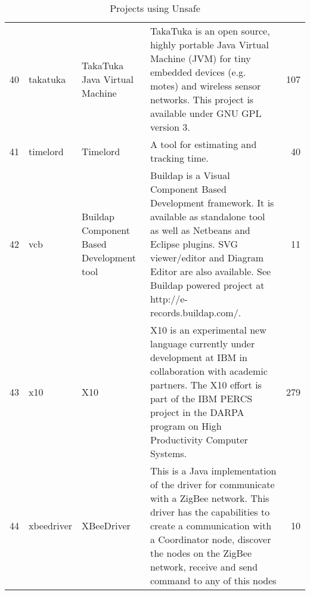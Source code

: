 \begin{table}[ht]
\begin{tabular}{rlllr}
  40 & takatuka & TakaTuka Java Virtual Machine & TakaTuka is an open source, highly portable Java Virtual Machine (JVM) for tiny embedded devices (e.g. motes) and wireless sensor networks. This project is available under GNU GPL version 3. & 107 \\ 
  41 & timelord & Timelord & A tool for estimating and tracking time. &  40 \\ 
  42 & vcb & Buildap Component Based Development tool & Buildap is a Visual Component Based Development framework. It is available as standalone tool as well as Netbeans and Eclipse plugins. SVG viewer/editor and Diagram Editor are also available. See Buildap powered project at http://e-records.buildap.com/. &  11 \\ 
  43 & x10 & X10 & X10 is an experimental new language currently under development at IBM in collaboration with academic partners. The X10 effort is part of the IBM PERCS project in the DARPA program on High Productivity Computer Systems. & 279 \\ 
  44 & xbeedriver & XBeeDriver & This is a Java implementation of the driver for communicate with a ZigBee network. This driver has the capabilities to create a communication with a Coordinator node, discover the nodes on the ZigBee network, receive and send command to any of this nodes &  10 \\ 
   \hline
\end{tabular}
\caption{Projects using Unsafe} 
\label{table:projects}
\end{table}
